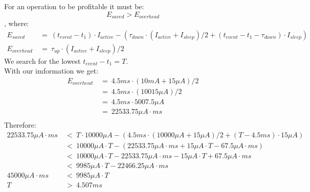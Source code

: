 \documentclass{article}
\begin{document}
\begin{adjustwidth}{2em}{2em}
\begin{enumerate}[a)]
			For an operation to be profitable it must be:
			\[
				E_{saved} > E_{overhead}
			\]
			, where:
			\begin{align*}
				E_{saved} \ & = \ (t_{event} - t_1) \cdot I_{active} - (\tau _{down} \cdot (I_{active} + I_{sleep}) / 2 + (t_{event} - t_1 - \tau _{down}) \cdot I_{sleep}) \\
				E_{overhead} \ & = \ \tau _{up} \cdot (I_{active} + I_{sleep}) / 2
			\end{align*}
			We search for the lowest $t_{event} - t_1 = T$. \\
			With our imformation we get:
			\begin{align*}
				E_{overhead} \ & = \ 4.5ms \cdot (10mA + 15 \mu A) / 2 \\
				& = \ 4.5ms \cdot (10015 \mu A) / 2 \\
				& = \ 4.5ms \cdot 5007.5 \mu A \\
				& = \ 22533.75 \mu A \cdot ms \\
			\end{align*}
			Therefore:
			\begin{align*}
				22533.75\mu A \cdot ms \ & < \ T \cdot 10000 \mu A - (4.5ms \cdot (10000 \mu A + 15 \mu A) / 2 + (T - 4.5ms) \cdot 15 \mu A) \\
				& < \ 10000 \mu A \cdot T - (22533.75 \mu A \cdot ms + 15 \mu A \cdot T - 67.5 \mu A \cdot ms) \\
				& < \ 10000 \mu A \cdot T - 22533.75 \mu A \cdot ms - 15 \mu A \cdot T + 67.5 \mu A \cdot ms \\
				& < \ 9985 \mu A \cdot T - 22466.25 \mu A \cdot ms \\
				45000 \mu A \cdot ms \ & < \ 9985 \mu A \cdot T \\
				T \ & > \ 4.507 ms 
			\end{align*}
		\end{enumerate}
	\end{adjustwidth}
	
\end{document}
